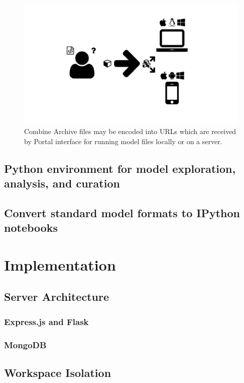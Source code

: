 \begin{figure}
  \centering
  \includegraphics[width=\textwidth,page=14,trim=0.37cm .65cm 0.37cm 0.3cm, clip=true]{images/Figures.pdf}
  \caption{Combine Archive files may be encoded into URLs which are received by Portal interface for running model files locally or on a server.}
  \label{Figure:carbon-combine-archive}
\end{figure}

\subsection{Python environment for model exploration, analysis, and curation}
\subsection{Convert standard model formats to IPython notebooks}


\section{Implementation}
\subsection{Server Architecture}
\subsubsection{Express.js and Flask}
\subsubsection{MongoDB}
\subsection{Workspace Isolation}
